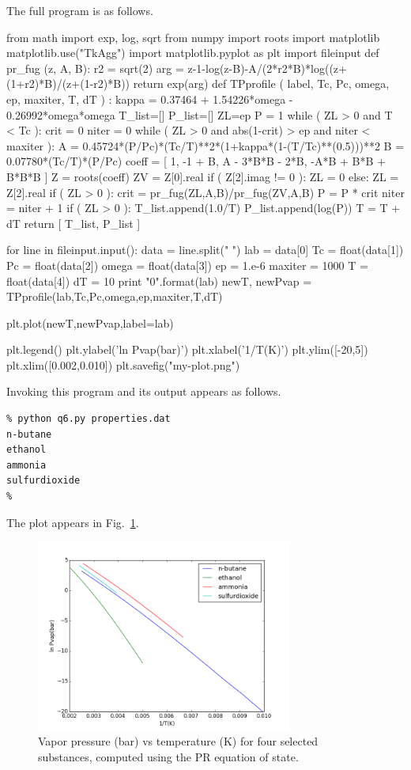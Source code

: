 \documentclass[11pt]{article}
\begin{document}
\begin{enumerate}
The full program is as follows.
\begin{python}
from math import exp, log, sqrt
from numpy import roots
import matplotlib
matplotlib.use("TkAgg")
import matplotlib.pyplot as plt
import fileinput
def pr_fug (z, A, B):
   r2 = sqrt(2)
   arg = z-1-log(z-B)-A/(2*r2*B)*log((z+(1+r2)*B)/(z+(1-r2)*B))
   return exp(arg)
def TPprofile ( label, Tc, Pc, omega, ep, maxiter, T, dT ) :
   kappa = 0.37464 + 1.54226*omega - 0.26992*omega*omega
   T_list=[]
   P_list=[]
   ZL=ep
   P = 1
   while ( ZL > 0 and T < Tc ):
     crit = 0
     niter = 0
     while ( ZL > 0 and abs(1-crit) > ep and niter < maxiter ):
        A = 0.45724*(P/Pc)*(Tc/T)**2*(1+kappa*(1-(T/Tc)**(0.5)))**2
        B = 0.07780*(Tc/T)*(P/Pc)
        coeff = [ 1, -1 + B, A - 3*B*B - 2*B, -A*B + B*B + B*B*B ]
        Z = roots(coeff)
        ZV = Z[0].real
        if ( Z[2].imag != 0 ):
           ZL = 0
        else:
           ZL = Z[2].real
        if ( ZL > 0 ):
           crit = pr_fug(ZL,A,B)/pr_fug(ZV,A,B)
           P = P * crit
           niter = niter + 1
     if ( ZL > 0 ):
       T_list.append(1.0/T)
       P_list.append(log(P))
       T = T + dT
   return [ T_list, P_list ]

for line in fileinput.input():
    data = line.split(" ")
    lab = data[0]
    Tc = float(data[1])
    Pc = float(data[2])
    omega = float(data[3])
    ep = 1.e-6
    maxiter = 1000
    T = float(data[4])
    dT = 10
    print "{0}".format(lab)
    newT, newPvap = TPprofile(lab,Tc,Pc,omega,ep,maxiter,T,dT)

    plt.plot(newT,newPvap,label=lab)

plt.legend()
plt.ylabel('ln Pvap(bar)')
plt.xlabel('1/T(K)')
plt.ylim([-20,5])
plt.xlim([0.002,0.010])
plt.savefig("my-plot.png")
\end{python}
%
Invoking this program and its output appears as follows.
%
\begin{verbatim}
% python q6.py properties.dat
n-butane
ethanol
ammonia
sulfurdioxide
%
\end{verbatim}
%
The plot appears in Fig.~\ref{fig:fig2}.

\begin{figure}[ht]
\includegraphics[width=0.75\textwidth]{my-plot.png}
\caption{\label{fig:fig2} Vapor pressure (bar) vs temperature (K) for four selected substances, computed using the PR equation of state.}
\end{figure}

\fi

\end{enumerate}
\end{document}
